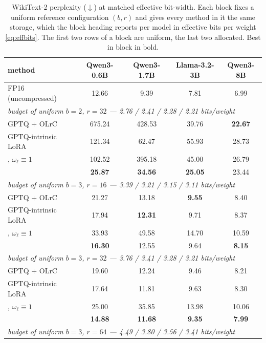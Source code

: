 \begin{table}[H]
\centering
\footnotesize
\setlength{\tabcolsep}{4pt}
\renewcommand{\arraystretch}{0.94}
\caption{WikiText-2 perplexity ($\downarrow$) at matched effective bit-width. Each block fixes a uniform reference configuration $(b, r)$ and gives every method in it the same storage, which the block heading reports per model in effective bits per weight \eqref{eq:effbits}. The first two rows of a block are uniform, the last two allocated. Best in block in bold.}
\label{tab:main}
\begin{tabular}{lcccc}
\toprule
method & Qwen3-0.6B & Qwen3-1.7B & Llama-3.2-3B & Qwen3-8B \\
\midrule
FP16 (uncompressed) & 12.66 & 9.39 & 7.81 & 6.99 \\
\midrule
\multicolumn{5}{l}{\emph{budget of uniform $b=2$, $r=32$ --- 2.76 / 2.41 / 2.28 / 2.21 bits/weight}} \\
\quad GPTQ + OLrC & 675.24 & 428.53 & 39.76 & \textbf{22.67} \\
\quad GPTQ-intrinsic LoRA & 121.34 & 62.47 & 55.93 & 28.73 \\
\quad \method{}, $\omega_\ell \equiv 1$ & 102.52 & 395.18 & 45.00 & 26.79 \\
\quad \method{} & \textbf{25.87} & \textbf{34.56} & \textbf{25.05} & 23.44 \\
\midrule
\multicolumn{5}{l}{\emph{budget of uniform $b=3$, $r=16$ --- 3.39 / 3.21 / 3.15 / 3.11 bits/weight}} \\
\quad GPTQ + OLrC & 21.27 & 13.18 & \textbf{9.55} & 8.40 \\
\quad GPTQ-intrinsic LoRA & 17.94 & \textbf{12.31} & 9.71 & 8.37 \\
\quad \method{}, $\omega_\ell \equiv 1$ & 33.93 & 49.58 & 14.70 & 10.59 \\
\quad \method{} & \textbf{16.30} & 12.55 & 9.64 & \textbf{8.15} \\
\midrule
\multicolumn{5}{l}{\emph{budget of uniform $b=3$, $r=32$ --- 3.76 / 3.41 / 3.28 / 3.21 bits/weight}} \\
\quad GPTQ + OLrC & 19.60 & 12.24 & 9.46 & 8.21 \\
\quad GPTQ-intrinsic LoRA & 17.64 & 11.81 & 9.63 & 8.30 \\
\quad \method{}, $\omega_\ell \equiv 1$ & 25.00 & 35.85 & 13.98 & 10.06 \\
\quad \method{} & \textbf{14.88} & \textbf{11.68} & \textbf{9.35} & \textbf{7.99} \\
\midrule
\multicolumn{5}{l}{\emph{budget of uniform $b=3$, $r=64$ --- 4.49 / 3.80 / 3.56 / 3.41 bits/weight}} \\

\end{tabular}
\end{table}
